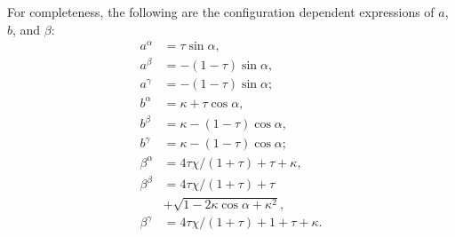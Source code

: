     For completeness, the following are the configuration dependent expressions of $a$, $b$, and
    $\beta$:
    \begin{align}
        \label{eq:aa}
        a^{\alpha}  &= \tau\sin\alpha,\\
        \label{eq:ab}
        a^{\beta}   &= -(1 - \tau)\sin\alpha,\\
        \label{eq:ag}
        a^{\gamma}  &= -(1 - \tau)\sin\alpha;\\
        \label{eq:ba}
        b^{\alpha}  &= \kappa + \tau\cos\alpha,\\
        \label{eq:bb}
        b^{\beta}   &= \kappa - (1 - \tau)\cos\alpha,\\
        \label{eq:bg}
        b^{\gamma}  &= \kappa - (1 - \tau)\cos\alpha;\\
        \label{eq:betaa}
        \beta^{\alpha}  &= 4\tau\chi/(1 + \tau) + \tau + \kappa,\\
        \label{eq:betab}
        \beta^{\beta}   &= 4\tau\chi/(1 + \tau) + \tau \nonumber\\
                        &+ \sqrt{1 - 2\kappa\cos\alpha + \kappa^2},\\
        \label{eq:betag}
        \beta^{\gamma}  &= 4\tau\chi/(1 + \tau) + 1 + \tau + \kappa.
    \end{align}


